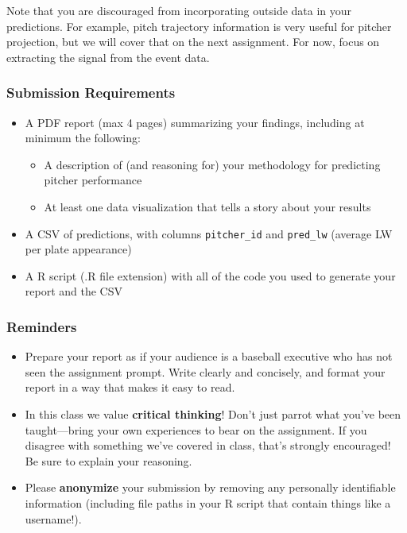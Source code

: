 \documentclass{article}
\begin{document}
      Note that you are discouraged from incorporating outside data in your predictions. For example, pitch trajectory information is very useful for pitcher projection, but we will cover that on the next assignment. For now, focus on extracting the signal from the event data.

      \subsubsection*{\sc Submission Requirements}

        \begin{itemize}
          \item A PDF report (max 4 pages) summarizing your findings, including at minimum the following:
          \begin{itemize}
            \item A description of (and reasoning for) your methodology for predicting pitcher performance
            \item At least one data visualization that tells a story about your results
          \end{itemize}
          \item A CSV of predictions, with columns \texttt{pitcher\_id} and \texttt{pred\_lw} (average LW per plate appearance)
          \item A R script (.R file extension) with all of the code you used to generate your report and the CSV
        \end{itemize}

      \subsubsection*{\sc Reminders}

        \begin{itemize}
          \item Prepare your report as if your audience is a baseball executive who has not seen the assignment prompt. Write clearly and concisely, and format your report in a way that makes it easy to read.
          \item In this class we value {\bf critical thinking}! Don't just parrot what you've been taught---bring your own experiences to bear on the assignment. If you disagree with something we've covered in class, that's strongly encouraged! Be sure to explain your reasoning.
          \item Please {\bf anonymize} your submission by removing any personally identifiable information (including file paths in your R script that contain things like a username!).
        \end{itemize}
\end{document}
